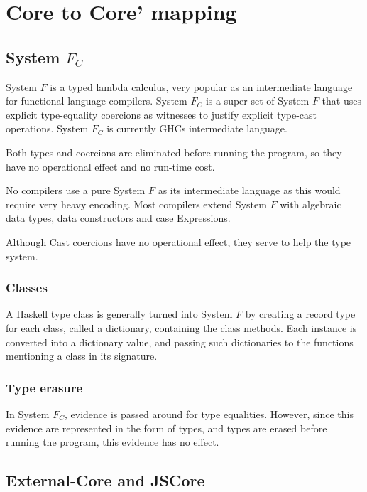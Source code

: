 

\chapter{Core to Core' mapping}
\label{chap:rewrite}

\section{System $F_C$}

System $F$ is a typed lambda calculus, very popular as an intermediate language
for functional language compilers. System $F_C$ is a super-set of System $F$ 
that uses explicit type-equality coercions as witnesses to justify explicit
type-cast operations. System $F_C$ is currently GHCs intermediate language.
\cite{sulzmann2007system}

Both types and coercions are eliminated before running the program, so they have
no operational effect and no run-time cost.
\cite{sulzmann2007system}

No compilers use a pure System $F$ as its intermediate language as this would
require very heavy encoding. Most compilers extend System $F$ with algebraic
data types, data constructors and case Expressions.
\cite{sulzmann2007system}

Although Cast coercions have no operational effect, they serve to help the
type system.

\subsection{Classes}
\label{subsec:classes}

A Haskell type class is generally turned into System $F$ by creating a 
record type for each class, called a dictionary, containing the class methods.
Each instance is converted into a dictionary value, and passing such 
dictionaries to the functions mentioning a class in its signature. 
\cite{sulzmann2007system}

\subsection{Type erasure}

In System $F_C$, evidence is passed around for type equalities. However,
since this evidence are represented in the form of types, and types are
erased before running the program, this evidence has no effect.
\cite{sulzmann2007system}

\section{External-Core and JSCore}

